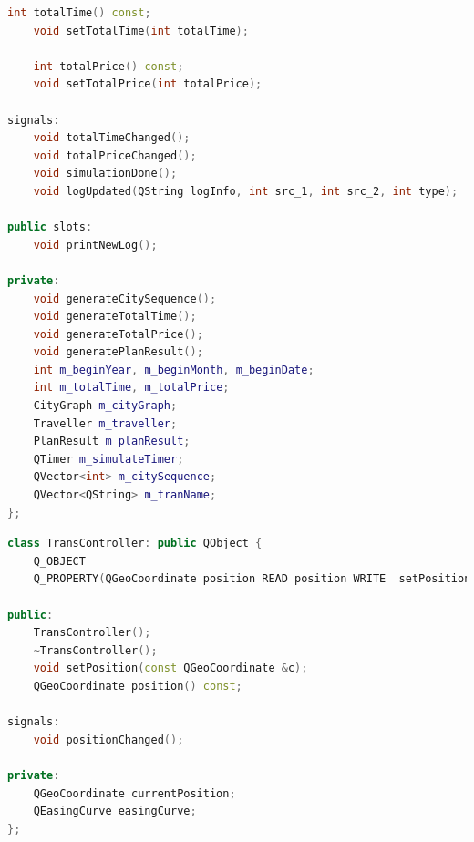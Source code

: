 \documentclass[lang=cn,blue,14pt]{elegantbook}
\begin{document}
\begin{lstlisting}[language=C++,caption={GraphHandler 的定义},captionpos=b]
	int totalTime() const;
	void setTotalTime(int totalTime);

	int totalPrice() const;
	void setTotalPrice(int totalPrice);

signals:
	void totalTimeChanged();
	void totalPriceChanged();
	void simulationDone();
	void logUpdated(QString logInfo, int src_1, int src_2, int type);

public slots:
	void printNewLog();

private:
	void generateCitySequence();
	void generateTotalTime();
	void generateTotalPrice();
	void generatePlanResult();
	int m_beginYear, m_beginMonth, m_beginDate;
	int m_totalTime, m_totalPrice;
	CityGraph m_cityGraph;
	Traveller m_traveller;
	PlanResult m_planResult;
	QTimer m_simulateTimer;
	QVector<int> m_citySequence;
	QVector<QString> m_tranName;
};
\end{lstlisting}

\begin{lstlisting}[language=C++,caption={TransController 的定义},captionpos=b]
class TransController: public QObject {
  	Q_OBJECT
  	Q_PROPERTY(QGeoCoordinate position READ position WRITE 	setPosition NOTIFY positionChanged)

public:
	TransController();
	~TransController();
	void setPosition(const QGeoCoordinate &c);
	QGeoCoordinate position() const;

signals:
	void positionChanged();

private:
	QGeoCoordinate currentPosition;
	QEasingCurve easingCurve;
};
\end{lstlisting}
\end{document}
